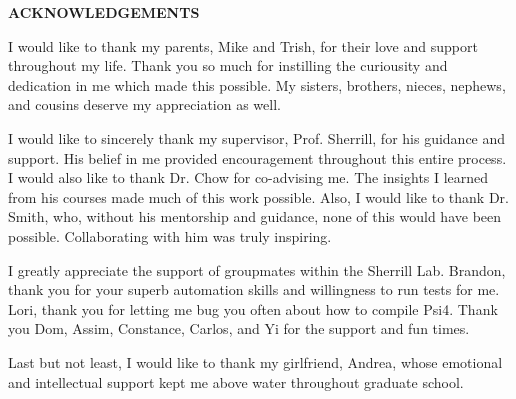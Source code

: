 \clearpage
\begin{centering}
\textbf{ACKNOWLEDGEMENTS}\\
\vspace{\baselineskip}
\end{centering}


\noindent I would like to thank my parents, Mike and Trish, for their love and support throughout my life.
Thank you so much for instilling the curiousity and dedication in me which made this possible.
My sisters, brothers, nieces, nephews, and cousins deserve my appreciation as well.

\hfill

\noindent I would like to sincerely thank my supervisor, Prof. Sherrill, for his guidance and support.
His belief in me provided encouragement throughout this entire process. I would also like to
thank Dr. Chow for co-advising me. The insights I learned from his courses made much of this work
possible. Also, I would like to thank Dr. Smith, who, without his mentorship and guidance, none
of this would have been possible. Collaborating with him was truly inspiring.

\hfill

\noindent I greatly appreciate the support of groupmates within the Sherrill Lab. Brandon, thank you for
your superb automation skills and willingness to run tests for me. Lori, thank you for letting me bug you often about
how to compile Psi4. Thank you Dom, Assim, Constance, Carlos, and Yi for the support and fun times. 

\hfill

\noindent Last but not least, I would like to thank my girlfriend, Andrea, whose emotional and intellectual support
kept me above water throughout graduate school.


\clearpage
